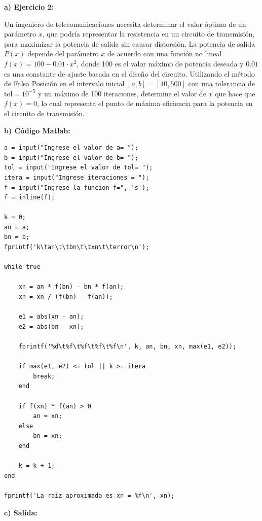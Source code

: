 \documentclass[12pt,a4paper,twoside]{article}  %
\begin{document}
\textbf{a) Ejercicio 2: }

Un ingeniero de telecomunicaciones necesita determinar el valor óptimo de un parámetro \( x \), que podría representar la resistencia en un circuito de transmisión, para maximizar la potencia de salida sin causar distorsión. La potencia de salida \( P(x) \) depende del parámetro \( x \) de acuerdo con una función no lineal \( f(x) = 100 - 0.01 \cdot x^2 \), donde 100 es el valor máximo de potencia deseada y \( 0.01 \) es una constante de ajuste basada en el diseño del circuito. Utilizando el método de Falsa Posición en el intervalo inicial \([a, b] = [10, 500]\) con una tolerancia de \( \text{tol} = 10^{-5} \) y un máximo de 100 iteraciones, determine el valor de \( x \) que hace que \( f(x) = 0 \), lo cual representa el punto de máxima eficiencia para la potencia en el circuito de transmisión.


\textbf{b) Código Matlab:}

\begin{lstlisting}
a = input("Ingrese el valor de a= ");
b = input("Ingrese el valor de b= ");
tol = input("Ingrese el valor de tol= ");
itera = input("Ingrese iteraciones = ");
f = input("Ingrese la funcion f=", 's');
f = inline(f);

k = 0; 
an = a;
bn = b;
fprintf('k\tan\t\tbn\t\txn\t\terror\n');

while true

    xn = an * f(bn) - bn * f(an);
    xn = xn / (f(bn) - f(an));
    
    e1 = abs(xn - an);
    e2 = abs(bn - xn);
    
    fprintf('%d\t%f\t%f\t%f\t%f\n', k, an, bn, xn, max(e1, e2));
    
    if max(e1, e2) <= tol || k >= itera
        break;
    end
    
    if f(xn) * f(an) > 0
        an = xn;
    else
        bn = xn;
    end
    
    k = k + 1;
end

fprintf('La raiz aproximada es xn = %f\n', xn);

\end{lstlisting}

\textbf{c) Salida:}
\end{document}
